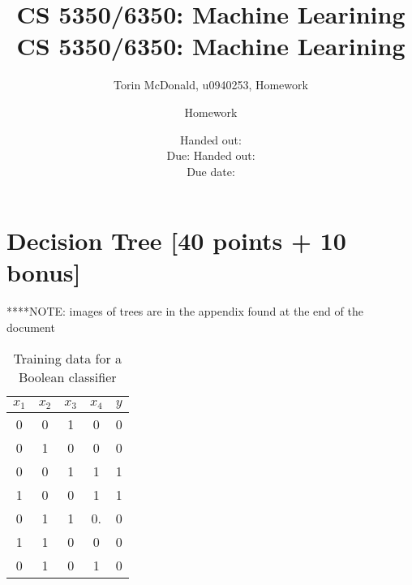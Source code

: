 \documentclass[12pt, fullpage,letterpaper]{article}
\title{CS 5350/6350: Machine Learining \semester}
\author{Torin McDonald, u0940253, Homework \assignmentId}
\date{Handed out: \releaseDate\\
	Due: \dueDate}
\title{CS 5350/6350: Machine Learining \semester}
\author{Homework \assignmentId}
\date{Handed out: \releaseDate\\
  Due date: \dueDate}
\begin{document}
\maketitle




\section{Decision Tree [40 points + 10 bonus]}

****NOTE: images of trees are in the appendix found at the end of the document

\begin{table}[h]
	\centering
	\begin{tabular}{cccc|c}
		$x_1$ & $x_2$ & $x_3$ & $x_4$ & $y$\\ 
		\hline\hline
		0 & 0 & 1 & 0 & 0 \\ \hline
		0 & 1 & 0 & 0 & 0 \\ \hline
		0 & 0 & 1 & 1 & 1 \\ \hline
		1 & 0 & 0 & 1 & 1 \\ \hline
		0 & 1 & 1 & 0.& 0\\ \hline
		1 & 1 & 0 & 0 & 0\\ \hline
		0 & 1 & 0 & 1 & 0\\ \hline
	\end{tabular}
	\caption{Training data for a Boolean classifier}
\end{table}
\end{document}
